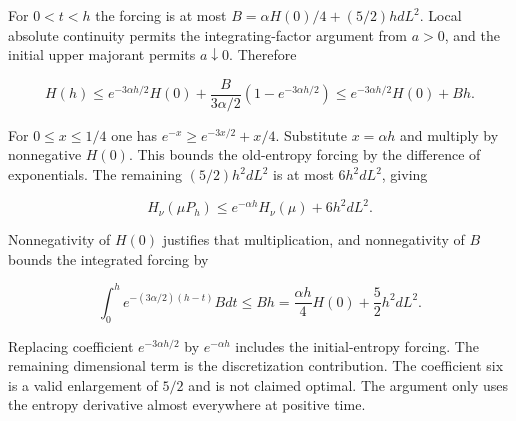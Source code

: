 \documentclass[11pt,a4paper]{article}
\begin{document}
For \(0<t<h\) the forcing is at most \(B=\alpha H(0)/4+(5/2)hdL^2\). Local absolute continuity permits the integrating-factor argument from \(a>0\), and the initial upper majorant permits \(a\downarrow0\). Therefore

\[H(h)\le e^{-3\alpha h/2}H(0)+\frac B{3\alpha/2}(1-e^{-3\alpha h/2})
\le e^{-3\alpha h/2}H(0)+Bh.\]

For \(0\le x\le1/4\) one has \(e^{-x}\ge e^{-3x/2}+x/4\). Substitute \(x=\alpha h\) and multiply by nonnegative \(H(0)\). This bounds the old-entropy forcing by the difference of exponentials. The remaining \((5/2)h^2dL^2\) is at most \(6h^2dL^2\), giving

\[\boxed{H_\nu(\mu P_h)\le e^{-\alpha h}H_\nu(\mu)+6h^2dL^2.}\]

Nonnegativity of \(H(0)\) justifies that multiplication, and nonnegativity of \(B\) bounds the integrated forcing by

\[\int_0^he^{-(3\alpha/2)(h-t)}Bdt\le Bh
=\frac{\alpha h}{4}H(0)+\frac52h^2dL^2.\]

Replacing coefficient \(e^{-3\alpha h/2}\) by \(e^{-\alpha h}\) includes the initial-entropy forcing. The remaining dimensional term is the discretization contribution. The coefficient six is a valid enlargement of \(5/2\) and is not claimed optimal. The argument only uses the entropy derivative almost everywhere at positive time.
\end{document}
